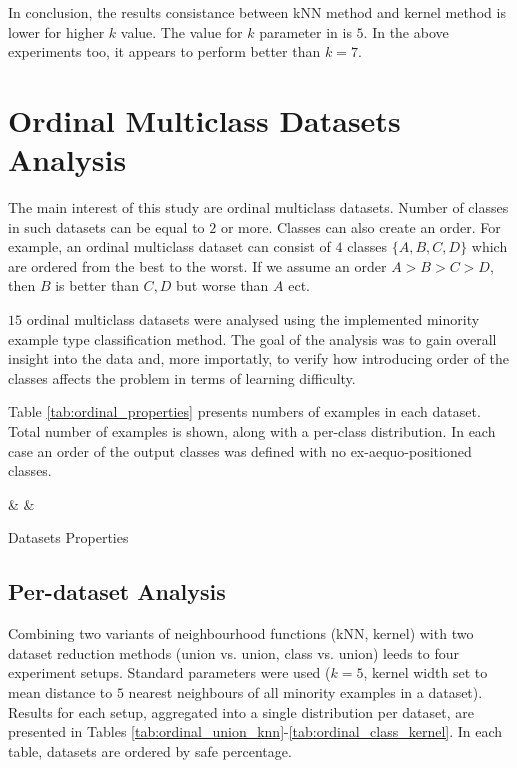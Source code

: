 \documentclass[12pt]{article}
\begin{document}
In conclusion, the results consistance between kNN method and kernel method is lower for higher $k$ value. The value for $k$ parameter in \cite{Napierala2016} is $5$. In the above experiments too, it appears to perform better than $k=7$.

\section{Ordinal Multiclass Datasets Analysis} \label{ordinal}

The main interest of this study are ordinal multiclass datasets. Number of classes in such datasets can be equal to $2$ or more. Classes can also create an order. For example, an ordinal multiclass dataset can consist of $4$ classes $\{A, B, C, D\}$ which are ordered from the best to the worst. If we assume an order $A > B > C > D$, then $B$ is better than $C, D$ but worse than $A$ ect.

$15$ ordinal multiclass datasets were analysed using the implemented minority example type classification method. The goal of the analysis was to gain overall insight into the data and, more importatly, to verify how introducing order of the classes affects the problem in terms of learning difficulty.

Table \ref{tab:ordinal_properties} presents numbers of examples in each dataset. Total number of examples is shown, along with a per-class distribution. In each case an order of the output classes was defined with no ex-aequo-positioned classes.

\begin{table}[H]
	\fontsize{10pt}{12pt}\selectfont
	\centering
	{}
	{\texttt{\filenames} & \totals & \distributed}
	\caption{Datasets Properties}
	\label{tab:ordinal_properties}
\end{table}

\subsection{Per-dataset Analysis} \label{per_dataset_analysis}

 Combining two variants of neighbourhood functions (kNN, kernel) with two dataset reduction methods (union vs. union, class vs. union) leeds to four experiment setups. Standard parameters were used ($k=5$, kernel width set to mean distance to $5$ nearest neighbours of all minority examples in a dataset). Results for each setup, aggregated into a single distribution per dataset, are presented in Tables \ref{tab:ordinal_union_knn}-\ref{tab:ordinal_class_kernel}. In each table, datasets are ordered by safe percentage.
\end{document}
